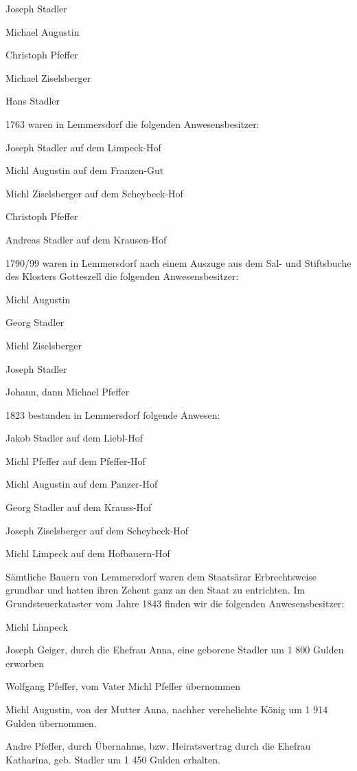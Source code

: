\documentclass[12pt,a4pager]{book}
\begin{document}
Joseph Stadler

Michael Augustin

Christoph Pfeffer

Michael Ziselsberger

Hans Stadler

1763 waren in Lemmersdorf die folgenden Anwesensbesitzer:

Joseph Stadler auf dem Limpeck-Hof

Michl Augustin auf dem Franzen-Gut

Michl Ziselsberger auf dem Scheybeck-Hof

Christoph Pfeffer

Andreas Stadler auf dem Krausen-Hof

1790/99 waren in Lemmersdorf nach einem Auszuge aus dem Sal- und Stiftsbuche des
Klosters Gotteszell die folgenden Anwesensbesitzer:

Michl Augustin

Georg Stadler

Michl Ziselsberger

Joseph Stadler

Johann, dann Michael Pfeffer

1823 bestanden in Lemmersdorf folgende Anwesen:

Jakob Stadler auf dem Liebl-Hof

Michl Pfeffer auf dem Pfeffer-Hof

Michl Augustin auf dem Panzer-Hof

Georg Stadler auf dem Krauss-Hof

Joseph Ziselsberger auf dem Scheybeck-Hof

Michl Limpeck auf dem Hofbauern-Hof

Sämtliche Bauern von Lemmersdorf waren dem Staatsärar Erbrechtsweise grundbar
und hatten ihren Zehent ganz an den Staat zu entrichten. Im Grundsteuerkataster
vom Jahre 1843 finden wir die folgenden Anwesensbesitzer:

Michl Limpeck

Joseph Geiger, durch die Ehefrau Anna, eine geborene Stadler um 1 800 Gulden
erworben

Wolfgang Pfeffer, vom Vater Michl Pfeffer übernommen

Michl Augustin, von der Mutter Anna, nachher verehelichte König um 1 914 Gulden
übernommen.

Andre Pfeffer, durch Übernahme, bzw. Heiratsvertrag durch die Ehefrau Katharina,
geb. Stadler um 1 450 Gulden erhalten.
\end{document}
